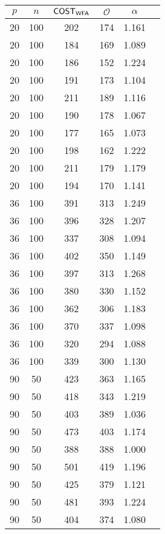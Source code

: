 \begin{table}[!hb]
\parbox{.45\linewidth}{
\centering
\begin{tabular}{|c|c|c|c|c|c|}
\hline
$p$ & $n$ & $\sf{COST}_{\sf{WFA}}$ & $\mathcal{O}$ & $\alpha$ \\
\hline
20  & 100  & 202       & 174	& 1.161 \\
20  & 100  & 184       & 169	& 1.089 \\
20  & 100  & 186       & 152	& 1.224 \\
20  & 100  & 191       & 173	& 1.104 \\
20  & 100  & 211       & 189	& 1.116 \\
20  & 100  & 190       & 178	& 1.067 \\
20  & 100  & 177       & 165	& 1.073 \\
20  & 100  & 198       & 162	& 1.222 \\
20  & 100  & 211       & 179	& 1.179 \\
20  & 100  & 194       & 170	& 1.141 \\
36  & 100  & 391       & 313	& 1.249 \\
36  & 100  & 396       & 328	& 1.207 \\
36  & 100  & 337       & 308	& 1.094 \\
36  & 100  & 402       & 350	& 1.149 \\
36  & 100  & 397       & 313	& 1.268 \\
36  & 100  & 380       & 330	& 1.152 \\
36  & 100  & 362       & 306	& 1.183 \\
36  & 100  & 370       & 337	& 1.098 \\
36  & 100  & 320       & 294	& 1.088 \\
36  & 100  & 339       & 300	& 1.130 \\
90  & 50   & 423       & 363	& 1.165 \\
90  & 50   & 418       & 343	& 1.219 \\
90  & 50   & 403       & 389	& 1.036 \\
90  & 50   & 473       & 403	& 1.174 \\
90  & 50   & 388       & 388	& 1.000 \\
90  & 50   & 501       & 419	& 1.196 \\
90  & 50   & 425       & 379	& 1.121 \\
90  & 50   & 481       & 393	& 1.224 \\
90  & 50   & 404       & 374	& 1.080 \\

\end{tabular}}
\end{table}
